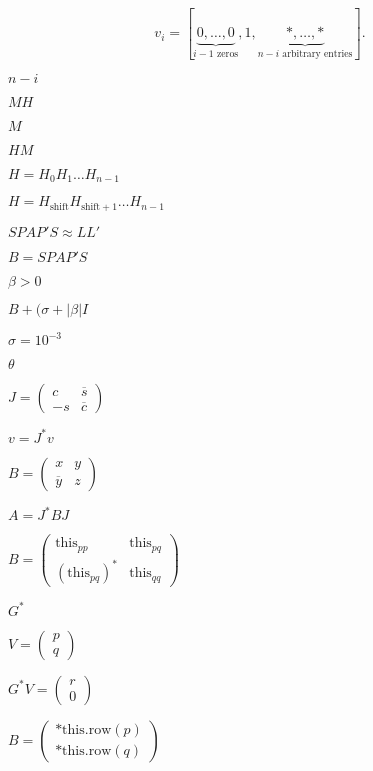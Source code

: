 \documentclass{article}
\begin{document}
\[ v_i = [\underbrace{0, \ldots, 0}_{i-1\mbox{ zeros}}, 1, \underbrace{*, \ldots,*}_{n-i\mbox{ arbitrary entries}} ]. \]
\pagebreak

$ n-i $
\pagebreak

$ MH $
\pagebreak

$ M $
\pagebreak

$ HM $
\pagebreak

$ H = H_0 H_1 \ldots H_{n-1} $
\pagebreak

$ H = H_{\mathrm{shift}} H_{\mathrm{shift}+1} \ldots H_{n-1} $
\pagebreak

$ S P A P' S \approx L L' $
\pagebreak

$ B = S P A P' S $
\pagebreak

$ \beta > 0 $
\pagebreak

$ B + (\sigma+|\beta| I $
\pagebreak

$ \sigma = 10^{-3} $
\pagebreak

$ \theta $
\pagebreak

$ J = \left ( \begin{array}{cc} c & \overline s \\ -s & \overline c \end{array} \right ) $
\pagebreak

$ v = J^* v $
\pagebreak

$ B = \left ( \begin{array}{cc} x & y \\ \overline y & z \end{array} \right )$
\pagebreak

$ A = J^* B J $
\pagebreak

$ B = \left ( \begin{array}{cc} \text{this}_{pp} & \text{this}_{pq} \\ (\text{this}_{pq})^* & \text{this}_{qq} \end{array} \right )$
\pagebreak

$ G^* $
\pagebreak

$ V = \left ( \begin{array}{c} p \\ q \end{array} \right )$
\pagebreak

$ G^* V = \left ( \begin{array}{c} r \\ 0 \end{array} \right )$
\pagebreak

$ B = \left ( \begin{array}{cc} \text{*this.row}(p) \\ \text{*this.row}(q) \end{array} \right ) $
\pagebreak
\end{document}
